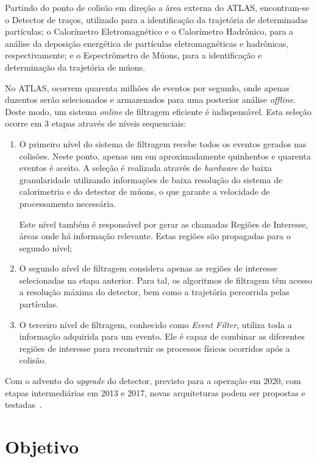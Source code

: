 Partindo do ponto de colisão em direção a área externa do ATLAS, encontram-se o
Detector de traços, utilizado para a identificação da trajetória de determinadas
partículas; o Calorímetro Eletromagnético e o Calorímetro Hadrônico, para a
análise da deposição energética de partículas eletromagnéticas e hadrônicas,
respectivamente; e o Espectrômetro de Múons, para a identificação
e determinação da trajetória de múons.

No ATLAS, ocorrem quarenta milhões de eventos por segundo, onde apenas duzentos
serão selecionados e armazenados para uma posterior análise \emph{offline}.
Deste modo, um sistema \emph{online} de filtragem eficiente é indispensável.
Esta seleção ocorre em 3 etapas através de níveis sequenciais:

\begin{enumerate}

    \item O primeiro nível do sistema de filtragem recebe todos os eventos
    gerados nas colisões. Neste ponto, apenas um em aproximadamente quinhentos e
    quarenta eventos é aceito.  A seleção é realizada através de \emph{hardware}
    de baixa granularidade utilizando informações de baixa resolução do sistema
    de calorimetria e do detector de múons, o que garante a velocidade de
    processamento necessária.

    Este nível também é responsável por gerar as chamadas Regiões de Interesse,
    áreas onde há informação relevante. Estas regiões são propagadas para o
    segundo nível;

    \item O segundo nível de filtragem considera apenas as regiões de interesse
    selecionadas na etapa anterior. Para tal, os algoritmos de filtragem têm
    acesso a resolução máxima do detector, bem como a trajetória percorrida
    pelas partículas.

    \item O terceiro nível de filtragem, conhecido como \emph{Event Filter},
    utiliza toda a informação adquirida para um evento. Ele é capaz de combinar
    as diferentes regiões de interesse para reconstruir os processos físicos
    ocorridos após a colisão.
\end{enumerate}

Com o advento do \emph{upgrade} do detector, previsto para a operação em 2020,
com etapas intermediárias em 2013 e 2017, novas arquiteturas podem ser propostas
e testadas~\cite{TSENG2008}.

\section{Objetivo}


